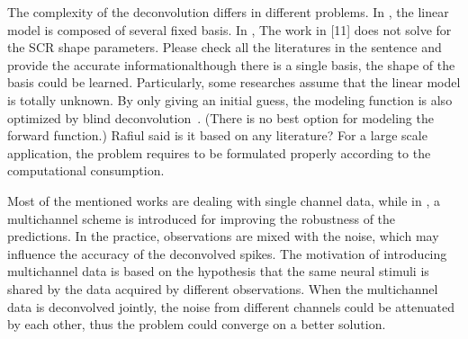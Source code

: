 \documentclass[10pt,conference]{ieeeconf}
\begin{document}
The complexity of the deconvolution differs in different problems. In \cite{hernando2017feature}, the linear model is composed of several fixed basis. In \cite{greco2014electrodermal,greco2015cvxeda,amin2019tonic,wickramasuriya2019skin,kazemipour2017fast,amin2019robust}, {\color{red}The work in [11] does not solve for the SCR shape parameters. Please check all the literatures in the sentence and provide the accurate information}although there is a single basis, the shape of the basis could be learned. Particularly, some researches assume that the linear model is totally unknown. By only giving an initial guess, the modeling function is also optimized by blind deconvolution~\cite{kaur2016remote,friedrich2017fast}. (There is no best option for modeling the forward function.){\color{red} Rafiul said is it based on any literature?} For a large scale application, the problem requires to be formulated properly according to the computational consumption.

Most of the mentioned works are dealing with single channel data, while in \cite{friedrich2017fast,amin2019robust}, a multichannel scheme is introduced for improving the robustness of the predictions. In the practice, observations are mixed with the noise, which may influence the accuracy of the deconvolved spikes. The motivation of introducing multichannel data is based on the hypothesis that the same neural stimuli is shared by the data acquired by different observations. When the multichannel data is deconvolved jointly, the noise from different channels could be attenuated by each other, thus the problem could converge on a better solution.
\end{document}
